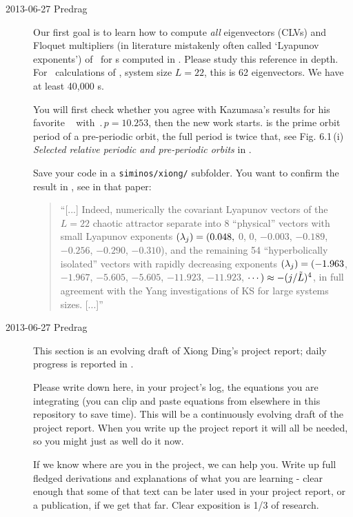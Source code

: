 \begin{description}

\item[2013-06-27 Predrag] Our first goal is to learn
how to compute \emph{all} eigenvectors (CLVs) and Floquet multipliers
(in literature mistakenly often called `Lyapunov exponents') of
\JacobianMs\ for \po s computed in .
Please study this reference in depth. For \KS\
calculations of , system size $L=22$, this is 62
eigenvectors. We have at least 40,000 \rpo s.

You will first check whether you agree with Kazumasa's results for his
favorite \po\  with $\period{p} = 10.253$, then the new work
starts. \PO{10.3} is the prime orbit period of a pre-periodic orbit,
the full period is twice that, see Fig. 6.1\,(i) \emph{Selected
relative periodic and pre-periodic orbits} in .

Save your code in a \texttt{siminos/xiong/} subfolder. You want to
confirm the result in \refref{SCD07}, see
 in
that paper:

\begin{quote}
``[...] Indeed, numerically the covariant Lyapunov
vectors of the $L=22$ chaotic attractor separate
into 8 ``physical'' vectors with small Lyapunov exponents
$(\lambda_j) = (0.048,$ 0, 0, $-0.003$, $-0.189$, $-0.256$,
$-0.290$, $-0.310$),
and the remaining 54 ``hyperbolically isolated'' vectors with rapidly
decreasing exponents
$(\lambda_j)
= (-1.963$,   $-1.967$,   $-5.605$,   $-5.605$,  $-11.923$,  $-11.923$,
 $\cdots) \approx -(j/\tilde{L})^4$,
in full agreement with the Yang \etal{} investigations
of KS for large systems sizes.
 [...]''
\end{quote}

\item[2013-06-27 Predrag]
This section is an evolving draft of Xiong Ding's project report;
daily progress is reported in \refsect{sect:dailyBlXD}.


Please {\color{red} write down here}, in your project's
log, the equations you are integrating (you can clip and paste
equations from elsewhere in this repository to save time).
This will be a continuously evolving draft of the project report.
When you
write up the project report it will all be needed, so you might just
as well do it now.

If we know where are you in the project, we can help you.
Write up full fledged
derivations and explanations of what you are learning - clear enough
that some of that text can be later used in your project report, or a
publication, if we get that far. Clear exposition is 1/3 of research.




\end{description}
